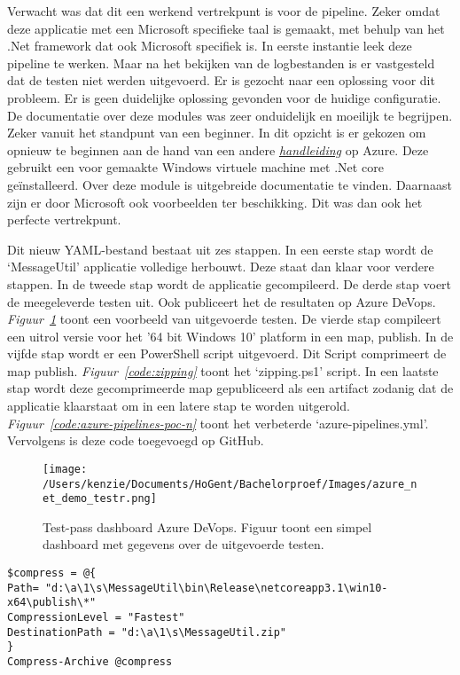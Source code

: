 Verwacht was dat dit een werkend vertrekpunt is voor de pipeline. Zeker omdat deze applicatie met een Microsoft specifieke taal is gemaakt, met behulp van het .Net framework dat ook Microsoft specifiek is. In eerste instantie leek deze pipeline te werken. Maar na het bekijken van de logbestanden is er vastgesteld dat de testen niet werden uitgevoerd. Er is gezocht naar een oplossing voor dit probleem. Er is geen duidelijke oplossing gevonden voor de huidige configuratie. De documentatie over deze modules was zeer onduidelijk en moeilijk te begrijpen. Zeker vanuit het standpunt van een beginner. In dit opzicht is er gekozen om opnieuw te beginnen aan de hand van een andere \emph{\href{https://docs.microsoft.com/en-us/azure/devops/pipelines/ecosystems/dotnet-core?view=azure-devops}{handleiding}} op Azure. Deze gebruikt een voor gemaakte Windows virtuele machine met .Net core geïnstalleerd. Over deze module is uitgebreide documentatie te vinden. Daarnaast zijn er door Microsoft ook voorbeelden ter beschikking. Dit was dan ook het perfecte vertrekpunt.

Dit nieuw YAML-bestand bestaat uit zes stappen. In een eerste stap wordt de ‘MessageUtil’ applicatie volledige herbouwt. Deze staat dan klaar voor verdere stappen. In de tweede stap wordt de applicatie gecompileerd. De derde stap voert de meegeleverde testen uit. Ook publiceert het de resultaten op Azure DeVops. \emph{Figuur~\ref{fig:Azure_POC_testr}} toont een voorbeeld van uitgevoerde testen. De vierde stap compileert een uitrol versie voor het '64 bit Windows 10' platform in een map, publish. In de vijfde stap wordt er een PowerShell script uitgevoerd. Dit Script comprimeert de map publish. \emph{Figuur~\ref{code:zipping}} toont het ‘zipping.ps1’ script. In een laatste stap wordt deze gecomprimeerde map gepubliceerd als een artifact zodanig dat de applicatie klaarstaat om in een latere stap te worden uitgerold. \emph{Figuur~\ref{code:azure-pipelines-poc-n}} toont het verbeterde ‘azure-pipelines.yml’. Vervolgens is deze code toegevoegd op GitHub.

\begin{figure}[!htbp]
    \centering
    \texttt{[image: /Users/kenzie/Documents/HoGent/Bachelorproef/Images/azure\_net\_demo\_testr.png]}
    \caption{Test-pass dashboard Azure DeVops. Figuur toont een simpel dashboard met gegevens over de uitgevoerde testen.}
    \label{fig:Azure_POC_testr}
\end{figure}

\begin{lstlisting}
$compress = @{
Path= "d:\a\1\s\MessageUtil\bin\Release\netcoreapp3.1\win10-x64\publish\*"
CompressionLevel = "Fastest"
DestinationPath = "d:\a\1\s\MessageUtil.zip"
}
Compress-Archive @compress
\end{lstlisting}

